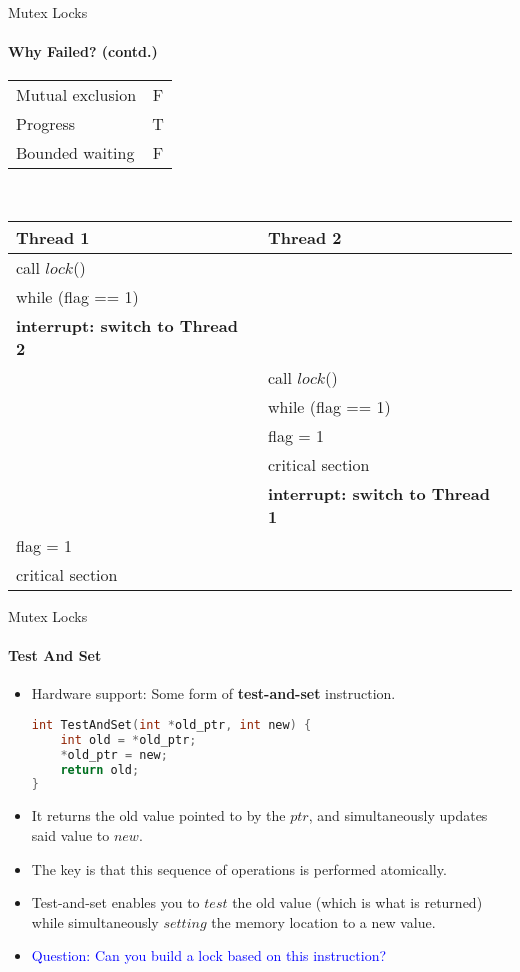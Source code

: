 \documentclass[10pt]{beamer}
\begin{document}
\begin{frame}{Mutex Locks}
\framesubtitle{Why Failed? (contd.)}
\scriptsize
\begin{tabular}{|l|c|}
\hline
Mutual exclusion & F\\
Progress & T\\
Bounded waiting & F\\
\hline
\end{tabular}
\\
\vspace{2em}
\centering
\begin{tabular}{l l}
\textbf{Thread 1}&\textbf{Thread 2}\\
\hline
call $lock$()&\\
while (flag == 1)&\\
\textbf{interrupt: switch to Thread 2}&\\
&call $lock$()\\
&while (flag == 1)\\
&flag = 1\\
& critical section\\
&\textbf{interrupt: switch to Thread 1}\\
flag = 1&\\
critical section&
\end{tabular}
\end{frame}

\begin{frame}[fragile]{Mutex Locks}
\framesubtitle{Test And Set}
\begin{itemize}
 
\item Hardware support: Some form of \textbf{\alert{test-and-set}} instruction.
\vspace{6pt}\\
\begin{lstlisting}[language=C]
int TestAndSet(int *old_ptr, int new) {
	int old = *old_ptr;
	*old_ptr = new;
	return old;
}
\end{lstlisting}
\item It returns the old value pointed to by the $ptr$, and simultaneously updates said value to $new$.
\item The key is that this sequence of operations is performed \alert{atomically}.
\item Test-and-set enables you to $test$ the old value (which is what is returned) while simultaneously $setting$ the memory location to a new value.
\item \textcolor{blue}{Question: Can you build a lock based on this instruction?}
\end{itemize}
\end{frame}
\end{document}
